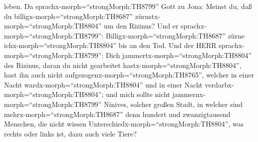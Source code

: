 leben.  Da sprachx-morph=``strongMorph:TH8799'' Gott zu
Jona: Meinst du, daß du billigx-morph=``strongMorph:TH8687''
zürnstx-morph=``strongMorph:TH8804'' um den Rizinus? Und er
sprachx-morph=``strongMorph:TH8799'':
Billigx-morph=``strongMorph:TH8687'' zürne
ichx-morph=``strongMorph:TH8804'' bis an den Tod.  Und der
HERR sprachx-morph=``strongMorph:TH8799'': Dich
jammertx-morph=``strongMorph:TH8804'' des Rizinus, daran du nicht
gearbeitet hastx-morph=``strongMorph:TH8804'', hast ihn auch nicht
aufgezogenx-morph=``strongMorph:TH8765'', welcher in einer Nacht
wardx-morph=``strongMorph:TH8804'' und in einer Nacht
verdarbx-morph=``strongMorph:TH8804'';  und mich sollte
nicht jammernx-morph=``strongMorph:TH8799'' Ninives, solcher großen
Stadt, in welcher sind mehrx-morph=``strongMorph:TH8687'' denn hundert
und zwanzigtausend Menschen, die nicht wissen
Unterschiedx-morph=``strongMorph:TH8804'', was rechts oder links ist,
dazu auch viele Tiere?
